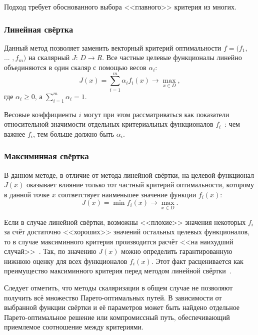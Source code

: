 Подход требует обоснованного выбора <<главного>> критерия из многих.

\subsubsection{Линейная свёртка}

Данный метод позволяет заменить векторный критерий оптимальности \(f=(f_1,\) ... \(,f_m)\) на скалярный \(J\): \(D \to R\). Все частные целевые функционалы линейно объединяются в один скаляр с помощью весов \(\alpha_i\):
\begin{equation}
	J(x) = \sum_{i = 1}^{m} \alpha_i f_i(x) \to \max_{x \in D},
\end{equation}
где \(\alpha_i \geqslant 0\), а \(\sum_{i = 1}^{m} \alpha_i = 1\).

Весовые коэффициенты \(i\) могут при этом рассматриваться как показатели относительной значимости отдельных критериальных функционалов \(f_i\)~\cite{avansky2007problems}: чем важнее \(f_i\), тем больше должно быть \(\alpha_i\). 

\subsubsection{Максиминная свёртка}

В данном методе, в отличие от метода линейной свёртки, на целевой функционал \(J(x)\) оказывает влияние только тот
частный критерий оптимальности, которому в данной точке \(x\) соответствует наименьшее значение функции
\(f_i(x)\): 
\begin{equation}
	J(x) = \min f_i(x) \to \max_{x \in D}.
\end{equation}

Если в случае линейной свёртки, возможны <<плохие>> значения некоторых \(f_i\) за счёт достаточно <<хороших>> значений остальных целевых функционалов, то в случае максиминного критерия производится расчёт <<на наихудший случай>>~\cite{avansky2007problems}. Так, по значению \(J(x)\) можно определить гарантированную нижнюю оценку для
всех функционалов \(f_i(x)\). Этот факт расценивается как преимущество максиминного критерия перед методом
линейной свёртки~\cite{avansky2007problems}.

Следует отметить, что методы скаляризации в общем случае не позволяют получить
всё множество Парето-оптимальных путей. В зависимости от выбранной функции
свёртки и её параметров может быть найдено отдельное Парето-оптимальное решение
или компромиссный путь, обеспечивающий приемлемое соотношение между критериями.

